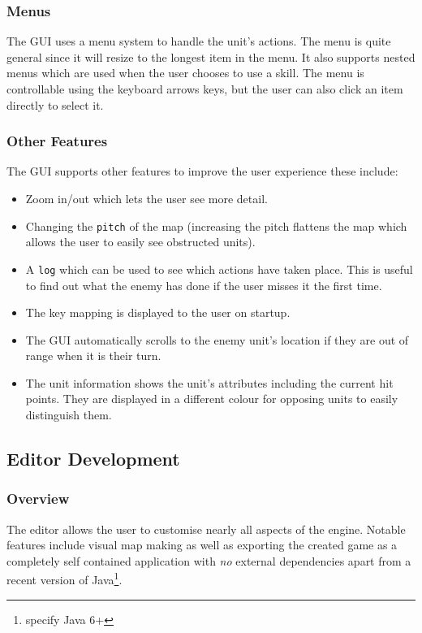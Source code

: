 \subsubsection{Menus}

The GUI uses a menu system to handle the unit's actions. The menu is quite general since it will resize to the longest item in the menu.  It also supports nested menus which are used when the user chooses to use a skill. The menu is controllable using the keyboard arrows keys, but the user can also click an item directly to select it.


\subsubsection{Other Features}
The GUI supports other features to improve the user experience these include:

\begin{itemize}
	\item Zoom in/out which lets the user see more detail. 
	\item Changing the \texttt{pitch} of the map (increasing the pitch flattens the map which allows the user to easily see obstructed units).
	\item A \texttt{log} which can be used to see which actions have taken place. This is useful to find out what the enemy has done if the user misses it the first time.
	\item The key mapping is displayed to the user on startup.
	\item The GUI automatically scrolls to the enemy unit's location if they are out of range when it is their turn.
	\item The unit information shows the unit's attributes including the current hit points. They are displayed in a different colour for opposing units to easily distinguish them. 
\end{itemize}


\subsection{Editor Development}

\subsubsection{Overview}
\label{ssub:overview}

The editor allows the user to customise nearly all aspects of the engine.  Notable features include visual map making as well as exporting the created game as a completely self contained application with \emph{no} external dependencies apart from a recent version of Java\footnote{specify Java 6+}. 

